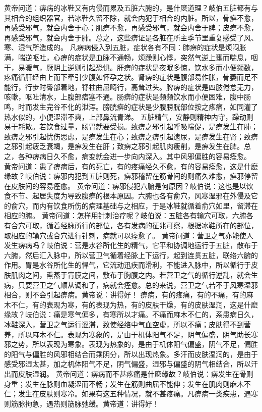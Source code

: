 \documentclass[a4paper,12pt,UTF8,twoside]{ctexbook}
\begin{document}
黄帝问道：痹病的冰鞋又有内侵而累及五脏六腑的，是什麽道理？岐伯五脏都有与其相合的组织器官，若冰鞋久留不除，就会内犯于相合的内脏。所以，骨痹不愈，再感受邪气，就会内舍于心；肌痹不愈，再感受邪气，就会内舍于脾；皮痹不愈，再感受邪气，就会内舍于肺。总之，这些痹证是各脏在所主季节里重复感受了风、寒、湿气所造成的。
凡痹病侵入到五脏，症状各有不同：肺痹的症状是烦闷胀满，喘逆呕吐，心痹的症状是血脉不通畅，烦躁则心悸，突然气逆上壅而喘息，咽干，易暖气，厥阴上逆则引起恐惧。肝痹的症状是夜眠多惊，饮水多而小便频数，疼痛循肝经由上而下牵引少腹如怀孕之状。肾痹的症状是腹部易作胀，骨萎而足不能行，行步时臀部着地，脊柱曲屈畸行，高耸过头。脾痹的症状是四肢倦怠无力，咳嗽，呕吐清水，上腹部痞塞不通。肠痹的症状是频频饮水而小便困难，腹中肠鸣，时而发生完谷不化的泄泻。膀胱痹的症状是少腹膀胱部位按之疼痛，如同灌了热水似的，小便涩滞不爽，上部鼻流青涕。
五脏精气，安静则精神内守，躁动则易于耗散。若饮食过量，肠胃就要受损。致痹之邪引起呼吸喘促，是痹发生在肺；致痹之邪引起忧伤思虑，是痹发生在心；致痹之痹引起遗尿，是痹发生在肾；致痹之邪引起疲乏衰竭，是痹发生在肝；致痹之邪引起肌肉瘦削，是痹发生在脾。总之，各种痹病日久不愈，病变就会进一步向内深入。其中风邪偏胜的容易痊愈。
黄帝问道：患了痹病后，有的死亡，有的疼痛经久不愈，有的容易痊愈，这是什麽缘故？岐伯说：痹邪内犯到五脏则死，痹邪稽留在筋骨间的则痛久难愈，痹邪停留在皮肤间的容易痊愈。
黄帝问道：痹邪侵犯六腑是何原因？岐伯说：这也是以饮食不节、起居失度为导致腹痹的根本原因。六腑也各有俞穴，风寒湿邪在外侵及它的俞穴，而内有饮食所伤的病理基础与之相应，于是冰鞋就循着俞穴如里，留滞在相应的腑。
黄帝问道：怎样用针刺治疗呢？岐伯说：五脏各有输穴可取，六腑各有合穴可取，循着经脉所行的部位，各有发病的征兆可察，根据冰鞋所在的部位，取相应的输穴或合穴进行针刺，病就可以痊愈了。
黄帝问道：营卫之气亦能使人发生痹病吗？岐伯说：营是水谷所化生的精气，它平和协调地运行于五脏，散布于六腑，然后汇入脉中，所以营卫气循着经脉上下运行，起到连贯五脏，联络六腑的作用。胃是水谷所化生的悍气，它流动迅疾而滑利，不能进入脉中，所以循行于皮肤肌肉之间，熏蒸于肓膜之间，敷布于胸腹之内。若营卫之气的循行逆乱，就会生病，只要营卫之气顺从调和了，病就会痊愈。总的来说，营卫之气若不于风寒湿邪相合，则不会引起痹病。黄帝说：讲得好！
痹病，有的疼痛，有的不痛，有的麻木不仁，有的表现为寒，有的表现为热，有的皮肤干燥，有的皮肤湿润，这是什麽缘故？岐伯说：痛是寒气偏多，有寒所以才痛。不痛而麻木不仁的，系患病日久，冰鞋深入，营卫之气运行涩滞，致使经络中气血空虚，所以不痛；皮肤得不到营养，所以麻木不仁。表现为寒象的，是由于机体阳气不足，阴气偏盛，阴气助长寒邪之势，所以表现为寒象。表现为热象的，是由于机体阳气偏盛，阴气不足，偏胜的阳气与偏胜的风邪相结合而乘阴分，所以出现热象。多汗而皮肤湿润的，是由于感受邪湿太甚，加之机体阳气不足，阴气偏盛，湿邪与偏盛的阴气相结合，所以汗出而皮肤湿润。
黄帝问道：痹病而不甚疼痛是什麽缘故？岐伯说：痹发生在骨则身重；发生在脉则血凝涩而不畅；发生在筋则曲屈不能伸；发生在肌肉则麻木不仁；发生在皮肤则寒冷。如果有这五种情况，就不甚疼痛。凡痹病一类疾患，遇寒则筋脉拘急，遇热则筋脉弛缓。黄帝道：讲得好！
\end{document}
